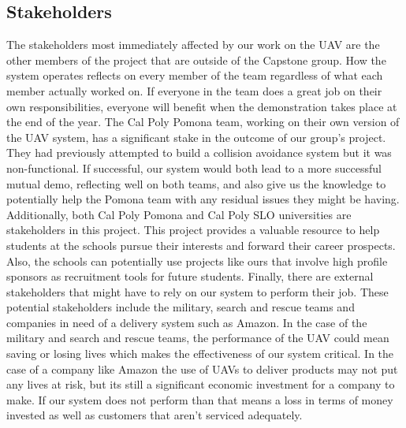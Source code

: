 \documentclass[12pt]{article}
\begin{document}
\subsection{Stakeholders}
	The stakeholders most immediately affected by our work on the UAV are the other members of the project that are outside of the Capstone group. How the system operates reflects on every member of the team regardless of what each member actually worked on. If everyone in the team does a great job on their own responsibilities, everyone will benefit when the demonstration takes place at the end of the year.
	The Cal Poly Pomona team, working on their own version of the UAV system, has a significant stake in the outcome of our group’s project. They had previously attempted to build a collision avoidance system but it was non-functional. If successful, our system would both lead to a more successful mutual demo, reflecting well on both teams, and also give us the knowledge to potentially help the Pomona team with any residual issues they might be having. Additionally, both Cal Poly Pomona and Cal Poly SLO universities are stakeholders in this project. This project provides a valuable resource to help students at the schools pursue their interests and forward their career prospects.  Also, the schools can potentially use projects like ours that involve high profile sponsors as recruitment tools for future students.
	Finally, there are external stakeholders that might have to rely on our system to perform their job. These potential stakeholders include the military, search and rescue teams and companies in need of a delivery system such as Amazon. In the case of the military and search and rescue teams, the performance of the UAV could mean saving or losing lives which makes the effectiveness of our system critical. In the case of a company like Amazon the use of UAVs to deliver products may not put any lives at risk, but its still a significant economic investment for a company to make. If our system does not perform than that means a loss in terms of money invested as well as customers that aren’t serviced adequately. 
\end{document}
